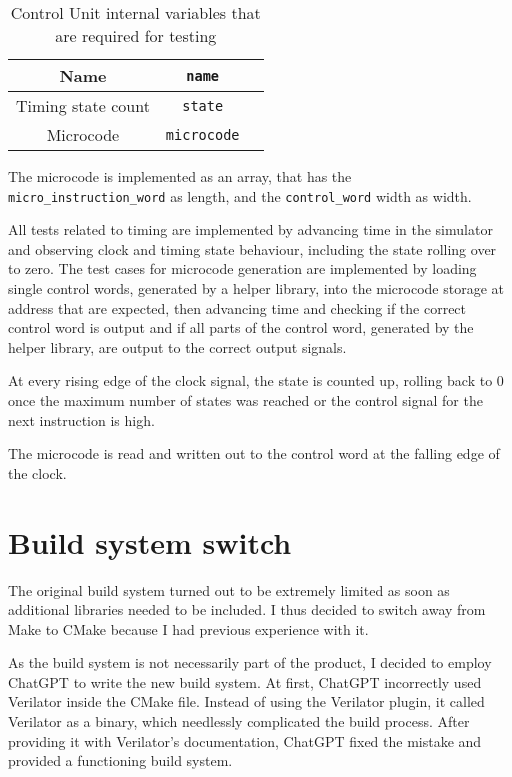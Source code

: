 \begin{table}[H]
  \begin{center}
  \begin{tabular}{ccc}
    Name                                    & \texttt{name}                          \\ \hline
    Timing state count & \texttt{state}                \\
    Microcode          & \texttt{microcode}                \\
  \end{tabular}

\end{center}
  \caption{Control Unit internal variables that are required for testing}
   \label{tab:reg-io}

  \end{table}

The microcode is implemented as an array, that has the \texttt{micro\_instruction\_word} as length, and the \texttt{control\_word} width as width.

All tests related to timing are implemented by advancing time in the simulator and observing clock and timing state behaviour, including the state rolling over to zero. The test cases for microcode generation are implemented by loading single control words, generated by a helper library, into the microcode storage at address that are expected, then advancing time and checking if the correct control word is output and if all parts of the control word, generated by the helper library, are output to the correct output signals. 

At every rising edge of the clock signal, the state is counted up, rolling back to 0 once the maximum number of states was reached or the control signal for the next instruction is high.

The microcode is read and written out to the control word at the falling edge of the clock. 

\section{Build system switch}
The original build system turned out to be extremely limited as soon as additional libraries needed to be included. I thus decided to switch away from Make to CMake because I had previous experience with it.

As the build system is not necessarily part of the product, I decided to employ ChatGPT \cite{chatgptbuildsystem} to write the new build system. At first, ChatGPT incorrectly used Verilator inside the CMake file. Instead of using the Verilator plugin, it called Verilator as a binary, which needlessly complicated the build process. After providing it with Verilator's documentation, ChatGPT fixed the mistake and provided a functioning build system. 

